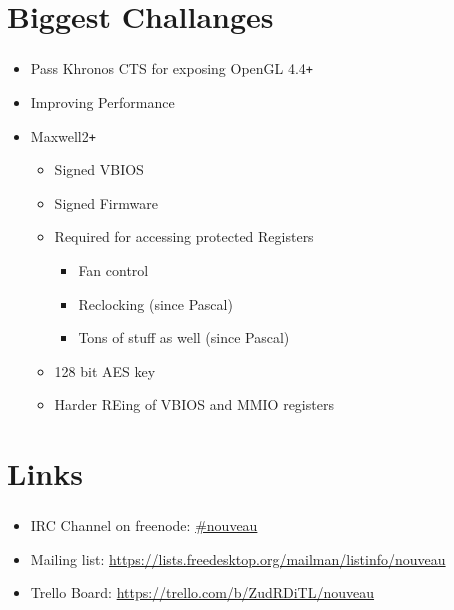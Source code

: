 \documentclass[aspectratio=169,english]{beamer}
\newcommand*{\ft}{\frametitle{\secname}}
\newcommand*{\itemp}{\item}
\newcommand*{\+}{\texttt{+}}
\newcommand{\sectionframeimpl}[2]{
	\begin{frame}
	#1
	\begin{itemize}
	#2
	\end{itemize}
	\end{frame}
}
\newcommand{\sectionframe}[2]{
	\section{#1}
	\sectionframeimpl{\ft}{#2}
}
\begin{document}
\sectionframe{Biggest Challanges}{
	\itemp Pass Khronos CTS for exposing OpenGL 4.4\+
	\itemp Improving Performance
	\itemp Maxwell2\+
	\begin{itemize}
		\itemp Signed VBIOS
		\itemp Signed Firmware
		\itemp Required for accessing protected Registers
		\begin{itemize}
			\itemp Fan control
			\itemp Reclocking (since Pascal)
			\itemp Tons of stuff as well (since Pascal)
		\end{itemize}
		\itemp 128 bit AES key
		\itemp Harder REing of VBIOS and MMIO registers
		\pause\only<2>{
			\begin{textblock*}{5cm}(9cm,2.2cm)
				\texttt{[image: linus]}
			\end{textblock*}
		}
	\end{itemize}
}

\sectionframe{Links}{
	\item IRC Channel on freenode: \href{ircs://chat.freenode.net:6697/\#nouveau}{\#nouveau}
	\item Mailing list: \url{https://lists.freedesktop.org/mailman/listinfo/nouveau}
	\item Trello Board: \url{https://trello.com/b/ZudRDiTL/nouveau}
}
\end{document}
